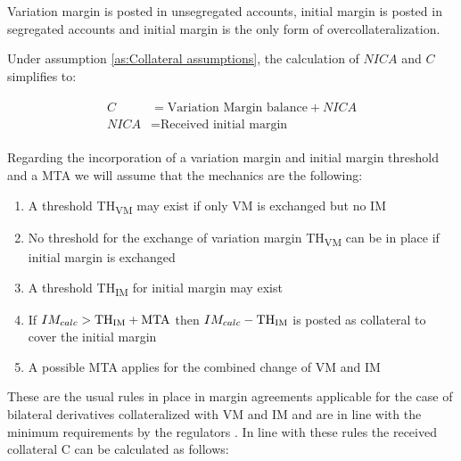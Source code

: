 \documentclass[../Thesis_AHoecherl.tex]{subfiles}
\begin{document}
\begin{assumption}\label{as:Collateral assumptions}
Variation margin is posted in unsegregated accounts, initial margin is posted in segregated accounts and initial margin is the only form of overcollateralization.
\end{assumption}

Under assumption \ref{as:Collateral assumptions}, the calculation of \(NICA\) and \(C\) simplifies to:

\begin{align}
	\begin{split}
		C&= \text{Variation Margin balance} + NICA\\ 
		NICA&= \text{Received initial margin}
	\end{split}
\end{align}

Regarding the incorporation of a variation margin and initial margin threshold and a MTA we will assume that the mechanics are the following:
\begin{enumerate}
	\item A threshold TH\textsubscript{VM} may exist if only VM is exchanged but no IM
	\item No threshold for the exchange of variation margin TH\textsubscript{VM} can be in place if initial margin is exchanged
	\item A threshold TH\textsubscript{IM} for initial margin may exist 
	\item If $ IM_{calc} > \text{TH\textsubscript{IM}} + \text{MTA} $ then $IM_{calc} - \text{TH\textsubscript{IM}} $ is posted as collateral to cover the initial margin
	\item A possible MTA applies for the combined change of VM and IM
\end{enumerate}

These are the usual rules in place in margin agreements applicable for the case of bilateral derivatives collateralized with VM and IM and are in line with the minimum requirements by the regulators \cite{BCBS_MarginRequirements}.
In line with these rules the received collateral C can be calculated as follows:
\end{document}
